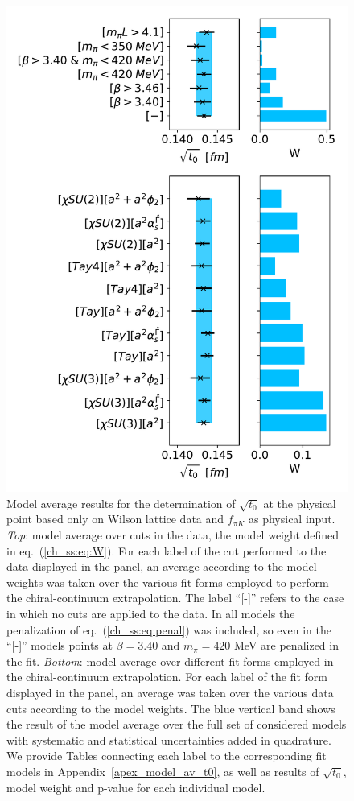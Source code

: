 \begin{figure}
    \centering
    \includegraphics[width=1.\textwidth]{./cap5/figs/BMA_w_subav_c=1_cphi=0.0035.pdf}
    \caption{Model average results for the determination of $\sqrt{t_0}$ at the physical point based only on Wilson lattice data and $f_{\pi K}$ as physical input. \textit{Top}: model average over cuts in the data, the model weight defined in eq.~(\ref{ch_ss:eq:W}). For each label of the cut performed to the data displayed in the panel, an average according to the model weights was taken over the various fit forms employed to perform the chiral-continuum extrapolation. The label ``[-]'' refers to the case in which no cuts are applied to the data. In all models the penalization of eq.~(\ref{ch_ss:eq:penal}) was included, so even in the ``[-]'' models points at $\beta=3.40$ and $m_{\pi}=420$ MeV are penalized in the fit. \textit{Bottom}: model average over different fit forms employed in  the chiral-continuum extrapolation. For each label of the fit form displayed in the panel, an average was taken over the various data cuts according to the model weights. The blue vertical band shows the result of the model average over the full set of considered models with systematic and statistical uncertainties added in quadrature. We provide Tables connecting each label to the corresponding fit models in Appendix~\ref{apex_model_av_t0}, as well as results of $\sqrt{t_0}$, model weight and p-value for each individual model.}
    \label{ch_ss:fig:BMA_w}
\end{figure}

